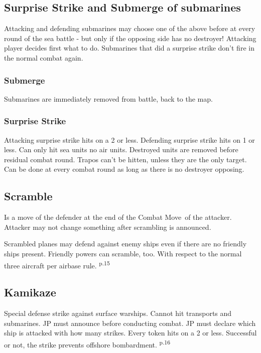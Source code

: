 \documentclass[10pt,twoside]{article}
\begin{document}
\begin{multicols*}{3}
\subsection*{Surprise Strike and Submerge of submarines}
Attacking and defending submarines may choose one of the above before at every round of the sea battle - but only if the opposing side has no destroyer! Attacking player decides first what to do. Submarines that did a surprise strike don't fire in the normal combat again.

\subsubsection*{Submerge}
Submarines are immediately removed from battle, back to the map.

\subsubsection*{Surprise Strike}
Attacking surprise strike hits on a 2 or less. Defending surprise strike hits on 1 or less. Can only hit sea units no air units. Destroyed units are removed before residual combat round. Trapos can't be hitten, unless they are the only target. Can be done at every combat round as long as there is no destroyer opposing.

\subsection*{Scramble}
Is a move of the defender at the end of the \glqq Combat Move\grqq\ of the attacker. Attacker may not change something after scrambling is announced.

Scrambled planes may defend against enemy ships even if there are no friendly ships present. Friendly powers can scramble, too. With respect to the normal three aircraft per airbase rule. \textsuperscript{p.15}

\subsection*{Kamikaze}
Special defense strike against surface warships. Cannot hit transports and submarines. JP must announce before conducting combat. JP must declare which ship is attacked with how many strikes. Every token hits on a 2 or less. Successful or not, the strike prevents offshore bombardment. \textsuperscript{p.16}


\end{multicols*}
\end{document}
